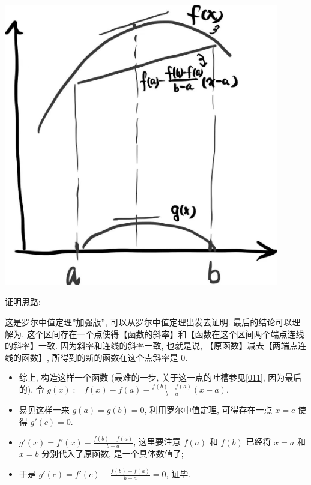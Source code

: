 \begin{tcolorbox}[size=fbox, breakable, enhanced jigsaw, title={洛必达法则 (L'Hôpital's
rule)}]
\begin{tcolorbox}[size=fbox, breakable, enhanced jigsaw, title={拉格朗日中值定理 (Lagrange mean value theorem)}]



\begin{tcolorbox}[size=fbox, breakable, enhanced jigsaw, sidebyside]
\includegraphics[width=0.9\textwidth]{img/image-20230615082602908.png}
\tcblower
{}
\end{tcolorbox}

\begin{newquote}
证明思路:

这是罗尔中值定理''加强版'', 可以从罗尔中值定理出发去证明.
最后的结论可以理解为,
这个区间存在一个点使得【函数的斜率】和【函数在这个区间两个端点连线的斜率】一致.
因为斜率和连线的斜率一致, 也就是说, 【原函数】减去【两端点连线的函数】,
所得到的新的函数在这个点斜率是 $0$.

\begin{itemize}

\item
  综上, 构造这样一个函数 (最难的一步, 关于这一点的吐槽参见\ref{011},
  因为最后的), 令 $g(x):=f(x)-f(a)-\frac{f(b)-f(a)}{b-a}(x-a)$.
\item
  易见这样一来 $g(a)=g(b)=0$, 利用罗尔中值定理, 可得存在一点 $x=c$
  使得 $g'(c)=0$.
\item
  $g'(x)=f'(x)-\frac{f(b)-f(a)}{b-a}$, 这里要注意 $f(a)$ 和 $f(b)$
  已经将 $x=a$ 和 $x=b$ 分别代入了原函数, 是一个具体数值了;
\item
  于是 $g'(c)=f'(c)-\frac{f(b)-f(a)}{b-a}=0$, 证毕.
\end{itemize}
\end{newquote}


\end{tcolorbox}
\end{tcolorbox}
